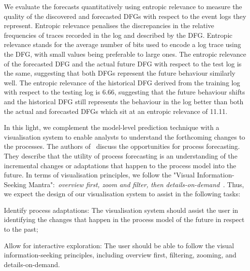 We evaluate the forecasts quantitatively using entropic relevance \cite{DBLP:conf/icpm/PolyvyanyyMG20} to measure the quality of the discovered and forecasted DFGs with respect to the event logs they represent. 
Entropic relevance penalises the discrepancies in the relative frequencies of traces recorded in the log and described by the DFG. Entropic relevance stands for the average number of bits used to encode a log trace using the DFG, with small values being preferable to large ones.
The entropic relevance of the forecasted DFG and the actual future DFG with respect to the test log is the same, suggesting that both DFGs represent the future behaviour similarly well. 
The entropic relevance of the historical DFG derived from the training log with respect to the testing log is 6.66, suggesting that the future behaviour shifts and the historical DFG still represents the behaviour in the log better than both the actual and forecasted DFGs which sit at an entropic relevance of 11.11. 

In this light, we complement the model-level prediction technique with a visualisation system to enable analysts to understand the forthcoming changes to the processes. The authors of~\cite{DBLP:conf/bpm/PollPRRR18} discuss the opportunities for process forecasting. They describe that the utility of process forecasting is an understanding of the incremental changes or adaptations that happen to the process model into the future. In terms of visualisation principles, we follow the "Visual Information-Seeking Mantra":~\emph{overview first, zoom and filter, then details-on-demand}~\cite{DBLP:conf/vl/Shneiderman96}. 
Thus, we expect the design of our visualisation system to assist in the following tasks:

\begin{requidescr}
	\item[Identify process adaptations:\namedlabel{req:adaptation}] The visualisation system should assist the user in identifying the changes that happen in the process model of the future in respect to the past;
	\item[Allow for interactive exploration:\namedlabel{req:interactive}] The user should be able to follow the visual information-seeking principles, including overview first, filtering, zooming, and details-on-demand.
\end{requidescr} %

